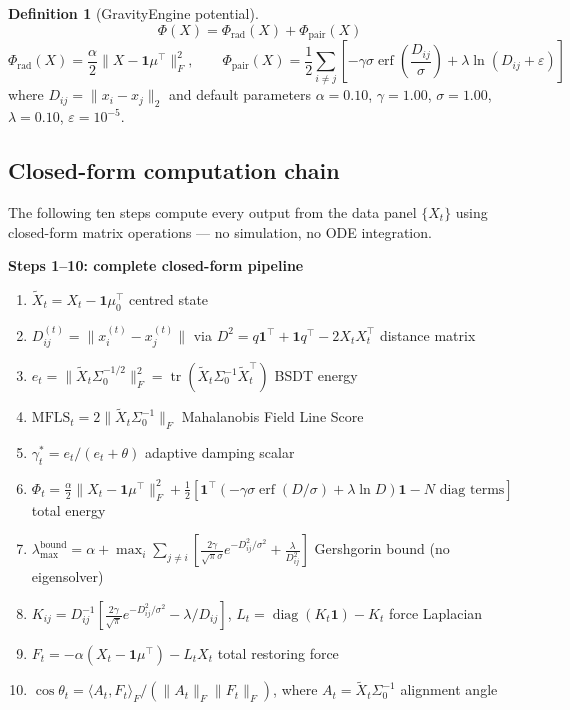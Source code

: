 \documentclass[11pt,a4paper]{article}
\theoremstyle{definition}
\newtheorem{definition}[theorem]{Definition}
\newcommand{\mfls}{\mathrm{MFLS}}
\begin{document}
\begin{definition}[GravityEngine potential]
\[
\Phi(X) = \Phi_\mathrm{rad}(X) + \Phi_\mathrm{pair}(X)
\]
\[
\Phi_\mathrm{rad}(X) = \frac{\alpha}{2}\|X - \mathbf{1}\mu^\top\|_F^2, \qquad
\Phi_\mathrm{pair}(X) = \frac{1}{2}\sum_{i\neq j}\!\left[
-\gamma\sigma\operatorname{erf}\!\left(\frac{D_{ij}}{\sigma}\right)
+\lambda\ln(D_{ij}+\varepsilon)\right]
\]
where $D_{ij} = \|x_i - x_j\|_2$ and default parameters
$\alpha=0.10$, $\gamma=1.00$, $\sigma=1.00$, $\lambda=0.10$, $\varepsilon=10^{-5}$.
\end{definition}

\subsection{Closed-form computation chain}

The following ten steps compute every output from the data panel $\{X_t\}$
using closed-form matrix operations — no simulation, no ODE integration.

\begin{lockedbox}
\textbf{Steps 1--10: complete closed-form pipeline}
\begin{enumerate}
\item $\tilde X_t = X_t - \mathbf{1}\mu_0^\top$ \hfill centred state
\item $D_{ij}^{(t)} = \|x_i^{(t)} - x_j^{(t)}\|$ via $D^2 = q\mathbf{1}^\top + \mathbf{1}q^\top - 2X_tX_t^\top$ \hfill distance matrix
\item $e_t = \|\tilde X_t\Sigma_0^{-1/2}\|_F^2 = \operatorname{tr}(\tilde X_t\Sigma_0^{-1}\tilde X_t^\top)$ \hfill BSDT energy
\item $\mfls_t = 2\|\tilde X_t\Sigma_0^{-1}\|_F$ \hfill Mahalanobis Field Line Score
\item $\gamma^*_t = e_t/(e_t+\theta)$ \hfill adaptive damping scalar
\item $\Phi_t = \frac{\alpha}{2}\|X_t-\mathbf{1}\mu^\top\|_F^2 + \frac{1}{2}[\mathbf{1}^\top(-\gamma\sigma\operatorname{erf}(D/\sigma)+\lambda\ln D)\mathbf{1} - N\text{ diag terms}]$ \hfill total energy
\item $\lambda_\mathrm{max}^\mathrm{bound} = \alpha + \max_i\sum_{j\neq i}\!\left[\frac{2\gamma}{\sqrt{\pi}\sigma}e^{-D_{ij}^2/\sigma^2} + \frac{\lambda}{D_{ij}^2}\right]$ \hfill Gershgorin bound (no eigensolver)
\item $K_{ij} = D_{ij}^{-1}[\frac{2\gamma}{\sqrt\pi}e^{-D_{ij}^2/\sigma^2} - \lambda/D_{ij}]$, $L_t = \operatorname{diag}(K_t\mathbf{1})-K_t$ \hfill force Laplacian
\item $F_t = -\alpha(X_t-\mathbf{1}\mu^\top) - L_t X_t$ \hfill total restoring force
\item $\cos\theta_t = \langle A_t, F_t\rangle_F/(\|A_t\|_F\|F_t\|_F)$, where $A_t = \tilde X_t\Sigma_0^{-1}$ \hfill alignment angle
\end{enumerate}
\end{lockedbox}
\end{document}
